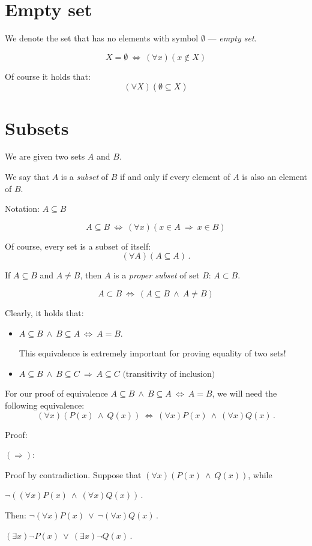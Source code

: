 \documentclass[11pt,paper=b5,footinclude,headinclude]{scrbook} %
\def\ali {{~\vee~}}
\def\inn {{~\wedge~}}
\def\sledi {{~\Rightarrow~}}
\def\cee {{~\Leftrightarrow~}}
\theoremstyle{remark}
\theoremstyle{definition} %
\theoremstyle{theorem} %
\begin{document}
\section{Empty set}
We denote the set that has no elements with symbol $\emptyset$ --- {\em empty set}.

$$X = \emptyset \cee (\forall x)(x\not\in X)$$

Of course it holds that:
$$(\forall X) (\emptyset \subseteq X)$$

\section{Subsets}
We are given two sets $A$ and $B$.

We say that $A$ is a {\em subset} of $B$ if and only if every element of $A$ is also an element of  $B$.

Notation: $A\subseteq B$

$$A\subseteq B\cee (\forall x)(x\in A\sledi x\in B)$$

Of course, every set is a subset of itself: $$(\forall A)(A\subseteq A)\,.$$

If $A\subseteq B$ and $A\neq B$, then $A$ is a  {\em proper subset } of set $B$: $A\subset B$.

$$A\subset B\cee (A\subseteq B \inn A\neq B)$$

Clearly, it holds that:
\begin{itemize}
  \item $A\subseteq B \inn B\subseteq A \cee A = B$.

  This equivalence is extremely important for proving equality of two sets!
  \item $A\subseteq B \inn B\subseteq C \sledi A \subseteq C \textrm{~(transitivity of inclusion)}$
\end{itemize}

For our proof of equivalence $A\subseteq B \inn B\subseteq A \cee A = B$, we will need the following
equivalence:
$$(\forall x)(P(x)\inn Q(x))\cee (\forall x)P(x)\inn (\forall x)Q(x)\,.$$

Proof:

$(\Rightarrow)$:

Proof by contradiction.
Suppose that $(\forall x)(P(x)\inn Q(x))$, while

$\neg((\forall x)P(x)\inn (\forall x)Q(x))\,.$

Then:
$\neg(\forall x)P(x)\ali \neg (\forall x)Q(x)\,.$

$(\exists  x)\neg P(x)\ali (\exists x)\neg Q(x)\,.$
\end{document}
